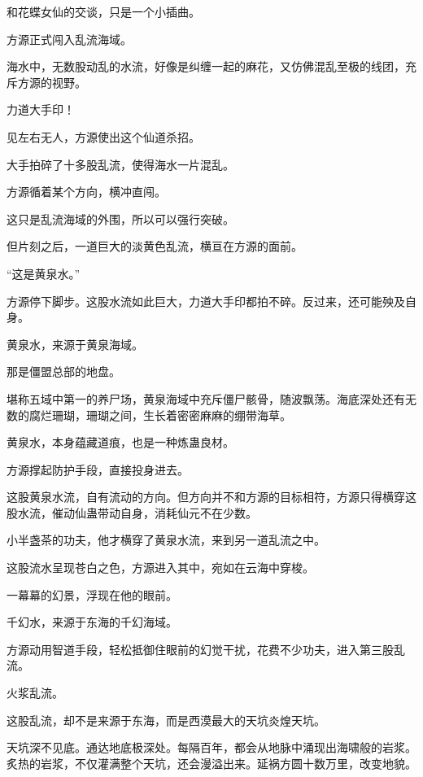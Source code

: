 
\begin{this_body}



和花蝶女仙的交谈，只是一个小插曲。

方源正式闯入乱流海域。

海水中，无数股动乱的水流，好像是纠缠一起的麻花，又仿佛混乱至极的线团，充斥方源的视野。

力道大手印！

见左右无人，方源使出这个仙道杀招。

大手拍碎了十多股乱流，使得海水一片混乱。

方源循着某个方向，横冲直闯。

这只是乱流海域的外围，所以可以强行突破。

但片刻之后，一道巨大的淡黄色乱流，横亘在方源的面前。

“这是黄泉水。”

方源停下脚步。这股水流如此巨大，力道大手印都拍不碎。反过来，还可能殃及自身。

黄泉水，来源于黄泉海域。

那是僵盟总部的地盘。

堪称五域中第一的养尸场，黄泉海域中充斥僵尸骸骨，随波飘荡。海底深处还有无数的腐烂珊瑚，珊瑚之间，生长着密密麻麻的绷带海草。

黄泉水，本身蕴藏道痕，也是一种炼蛊良材。

方源撑起防护手段，直接投身进去。

这股黄泉水流，自有流动的方向。但方向并不和方源的目标相符，方源只得横穿这股水流，催动仙蛊带动自身，消耗仙元不在少数。

小半盏茶的功夫，他才横穿了黄泉水流，来到另一道乱流之中。

这股流水呈现苍白之色，方源进入其中，宛如在云海中穿梭。

一幕幕的幻景，浮现在他的眼前。

千幻水，来源于东海的千幻海域。

方源动用智道手段，轻松抵御住眼前的幻觉干扰，花费不少功夫，进入第三股乱流。

火浆乱流。

这股乱流，却不是来源于东海，而是西漠最大的天坑炎煌天坑。

天坑深不见底。通达地底极深处。每隔百年，都会从地脉中涌现出海啸般的岩浆。炙热的岩浆，不仅灌满整个天坑，还会漫溢出来。延祸方圆十数万里，改变地貌。


\end{this_body}
